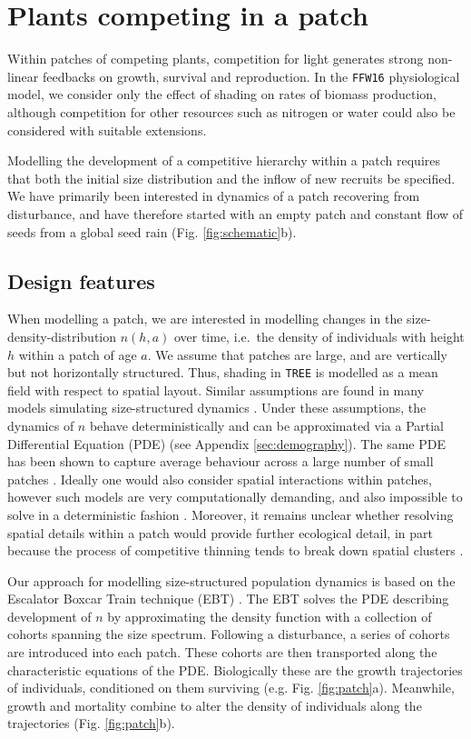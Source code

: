 \documentclass[a4paper,11pt]{article}
\begin{document}
\section{Plants competing in a patch}

Within patches of competing plants, competition for light generates
strong non-linear feedbacks on growth, survival and reproduction. In the
\texttt{FFW16} physiological model, we consider only the effect of
shading on rates of biomass production, although competition for other
resources such as nitrogen or water could also be considered with
suitable extensions.

Modelling the development of a competitive hierarchy within a patch
requires that both the initial size distribution and the inflow of new
recruits be specified. We have primarily been interested in dynamics of
a patch recovering from disturbance, and have therefore started with an
empty patch and constant flow of seeds from a global seed rain (Fig.
\ref{fig:schematic}b).

\subsection{Design features}

When modelling a patch, we are interested in modelling changes in the
size-density-distribution \(n(h,a)\) over time, i.e.~the density of
individuals with height \(h\) within a patch of age \(a\). We assume
that patches are large, and are vertically but not horizontally
structured. Thus, shading in \texttt{TREE} is modelled as a mean field with
respect to spatial layout. Similar assumptions are found in many models
simulating size-structured dynamics
\citep{Moorcroft-2001, Huston-1987, Smith-2014}. Under these
assumptions, the dynamics of \(n\) behave deterministically and can be
approximated via a Partial Differential Equation (PDE) (see Appendix
\ref{sec:demography}). The same PDE has been shown to capture average behaviour
across a large number of small patches \citep{Moorcroft-2001}. Ideally
one would also consider spatial interactions within patches,
however such models are very computationally demanding, and also
impossible to solve in a deterministic fashion \citep{Pacala-1996}.
Moreover, it remains unclear whether resolving spatial details within a
patch would provide further ecological detail, in part because the
process of competitive thinning tends to break down spatial clusters
\citep{Strigul-2008}.

Our approach for modelling size-structured population dynamics
is based on the Escalator Boxcar Train technique (EBT)
\citep{Deroos-1997, Deroos-1992, Deroos-1988}. The EBT solves the PDE
describing development of \(n\) by approximating the density function
with a collection of cohorts spanning the size spectrum. Following a
disturbance, a series of cohorts are introduced into each patch. These
cohorts are then transported along the characteristic equations of the
PDE. Biologically these are the growth trajectories of individuals,
conditioned on them surviving (e.g. Fig. \ref{fig:patch}a). Meanwhile,
growth and mortality combine to alter the density of individuals along
the trajectories (Fig. \ref{fig:patch}b).
\end{document}
